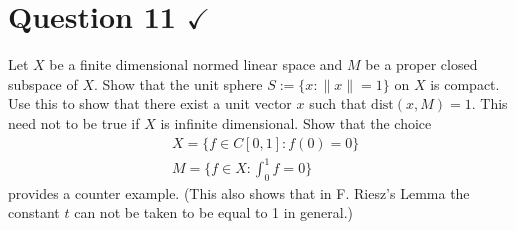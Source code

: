 \section{Question 11 \texorpdfstring{$\checkmark$}{}}
\horz
Let $X$ be a finite dimensional normed linear space and $M$ be a proper closed subspace of $X$. Show that the unit sphere  $S := \{x: \|x\|=1\}$ on $X$ is compact. Use this to show that there exist a unit vector $x$ such that $\text{dist}(x, M) = 1.$ This need not to be true if $X$ is infinite dimensional. Show that the choice
    \begin{align*}
       & X = \{f \in C[0, 1] : f(0) = 0\}\\
        &M= \{f \in X : \int_{0}^{1}f = 0\}
    \end{align*}
provides a counter example. (This also shows that in F. Riesz's Lemma the constant $t$ can not be taken to be equal to 1 in general.)
\horz

